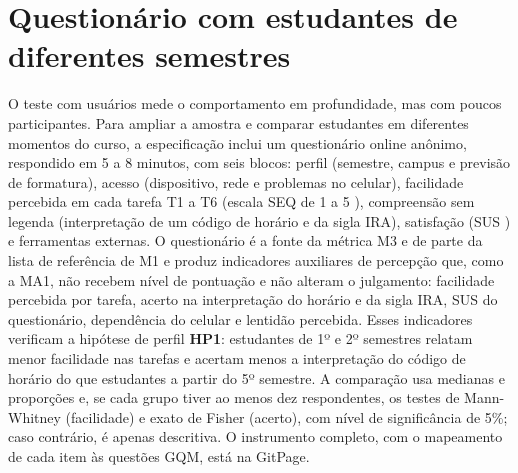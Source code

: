 \section{Questionário com estudantes de diferentes semestres}
\label{sec:questionario}

O teste com usuários mede o comportamento em profundidade, mas com poucos participantes. Para ampliar a amostra e comparar estudantes em diferentes momentos do curso, a especificação inclui um questionário online anônimo, respondido em 5 a 8 minutos, com seis blocos: perfil (semestre, campus e previsão de formatura), acesso (dispositivo, rede e problemas no celular), facilidade percebida em cada tarefa T1 a T6 (escala SEQ de 1 a 5 \cite{sauro2016}), compreensão sem legenda (interpretação de um código de horário e da sigla IRA), satisfação (SUS \cite{brooke1996}) e ferramentas externas. O questionário é a fonte da métrica M3 e de parte da lista de referência de M1 e produz indicadores auxiliares de percepção que, como a MA1, não recebem nível de pontuação e não alteram o julgamento: facilidade percebida por tarefa, acerto na interpretação do horário e da sigla IRA, SUS do questionário, dependência do celular e lentidão percebida. Esses indicadores verificam a hipótese de perfil \textbf{HP1}: estudantes de 1º e 2º semestres relatam menor facilidade nas tarefas e acertam menos a interpretação do código de horário do que estudantes a partir do 5º semestre. A comparação usa medianas e proporções e, se cada grupo tiver ao menos dez respondentes, os testes de Mann-Whitney (facilidade) e exato de Fisher (acerto), com nível de significância de 5\%; caso contrário, é apenas descritiva. O instrumento completo, com o mapeamento de cada item às questões GQM, está na GitPage.
